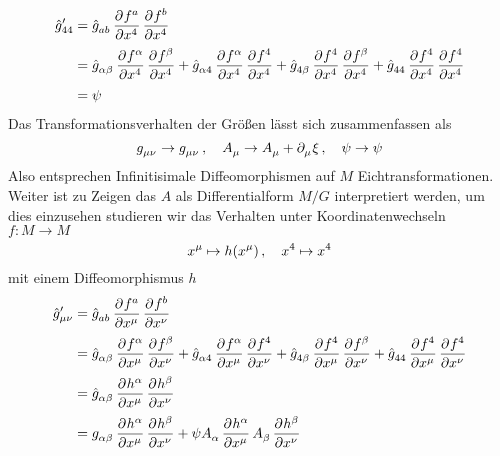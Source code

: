 \begin{equation}
\begin{split}
\tensor*{\hat{g}}{*^\prime_4_4}&=\tensor{\hat{g}}{_a_b}\dpd{f^a}{\tensor{x}{^4}}\dpd{f^b}{\tensor{x}{^4}}\\
&=\tensor{\hat{g}}{_\alpha_\beta}\dpd{f^\alpha}{\tensor{x}{^4}}\dpd{f^\beta}{\tensor{x}{^4}}
+\tensor{\hat{g}}{_\alpha_4}\dpd{f^\alpha}{\tensor{x}{^4}}\dpd{f^4}{\tensor{x}{^4}}
+\tensor{\hat{g}}{_4_\beta}\dpd{f^4}{\tensor{x}{^4}}\dpd{f^\beta}{\tensor{x}{^4}}
+\tensor{\hat{g}}{_4_4}\dpd{f^4}{\tensor{x}{^4}}\dpd{f^4}{\tensor{x}{^4}}\\
&=\psi
\end{split}
\end{equation}
Das Transformationsverhalten der Größen lässt sich zusammenfassen als 
\begin{equation}
\tensor{g}{_\mu_\nu}\to\tensor{g}{_\mu_\nu}\,,\quad
\tensor{A}{_\mu}\to\tensor{A}{_\mu}+\pdif{_\mu}\xi\,,\quad
\psi\to\psi
\end{equation}
Also entsprechen Infinitisimale Diffeomorphismen auf $M$ Eichtransformationen.
Weiter ist zu Zeigen das $A$ als Differentialform $M/G$ interpretiert werden,
um dies einzusehen studieren wir das Verhalten unter Koordinatenwechseln $f:M\to
M$
\begin{equation}
\tensor{x}{^\mu}\mapsto
h(\tensor{x}{^\mu})\,,\quad\tensor{x}{^4}\mapsto\tensor{x}{^4}
\end{equation}
mit einem Diffeomorphismus $h$
\begin{equation}
\begin{split}
\tensor*{\hat{g}}{*^\prime_\mu_\nu}&=\tensor{\hat{g}}{_a_b}\dpd{f^a}{\tensor{x}{^\mu}}\dpd{f^b}{\tensor{x}{^\nu}}\\
&=\tensor{\hat{g}}{_\alpha_\beta}\dpd{f^\alpha}{\tensor{x}{^\mu}}\dpd{f^\beta}{\tensor{x}{^\nu}}
+\tensor{\hat{g}}{_\alpha_4}\dpd{f^\alpha}{\tensor{x}{^\mu}}\dpd{f^4}{\tensor{x}{^\nu}}
+\tensor{\hat{g}}{_4_\beta}\dpd{f^4}{\tensor{x}{^\mu}}\dpd{f^\beta}{\tensor{x}{^\nu}}
+\tensor{\hat{g}}{_4_4}\dpd{f^4}{\tensor{x}{^\mu}}\dpd{f^4}{\tensor{x}{^\nu}}\\
&=\tensor{\hat{g}}{_\alpha_\beta}\dpd{h^\alpha}{\tensor{x}{^\mu}}\dpd{h^\beta}{\tensor{x}{^\nu}}\\
&=\tensor{g}{_\alpha_\beta}\dpd{h^\alpha}{\tensor{x}{^\mu}}\dpd{h^\beta}{\tensor{x}{^\nu}}
+\psi\tensor{A}{_\alpha}\dpd{h^\alpha}{\tensor{x}{^\mu}}
\tensor{A}{_\beta}\dpd{h^\beta}{\tensor{x}{^\nu}}
\end{split}
\end{equation}
